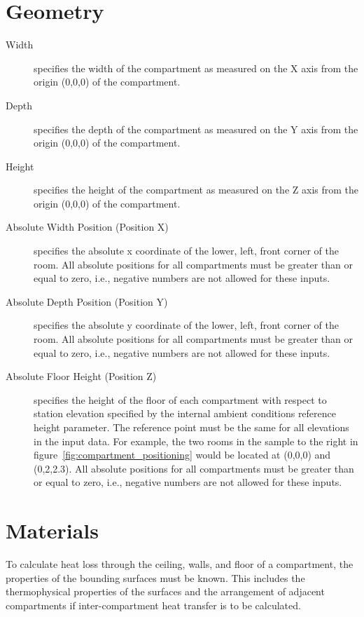 \section{Geometry}

\label{Compartment_Inputs}
\begin{description}
\item[Width] specifies the width of the compartment as measured on the X axis from the origin (0,0,0) of the compartment.

\item[Depth] specifies the depth of the compartment as measured on the Y axis from the origin (0,0,0) of the compartment.

\item[Height] specifies the height of the compartment as measured on the Z axis from the origin (0,0,0) of the compartment.

\item[Absolute Width Position (Position X)] specifies the absolute x coordinate of the lower, left, front corner of the room. All absolute positions for all compartments must be greater than or equal to zero, i.e., negative numbers are not allowed for these inputs.

\item[Absolute Depth Position (Position Y)] specifies the absolute y coordinate of the lower, left, front corner of the room. All absolute positions for all compartments must be greater than or equal to zero, i.e., negative numbers are not allowed for these inputs.

\item[Absolute Floor Height (Position Z)] specifies the height of the floor of each compartment with respect to station elevation specified by the internal ambient conditions reference height parameter.  The reference point must be the same for all elevations in the input data.  For example, the two rooms in the sample to the right in figure~\ref{fig:compartment_positioning} would be located at (0,0,0) and (0,2,2.3). All absolute positions for all compartments must be greater than or equal to zero, i.e., negative numbers are not allowed for these inputs.
\end{description}

\section{Materials}

To calculate heat loss through the ceiling, walls, and floor of a compartment, the properties of the bounding surfaces must be known. This includes the thermophysical properties of the surfaces and the arrangement of adjacent compartments if inter-compartment heat transfer is to be calculated.

